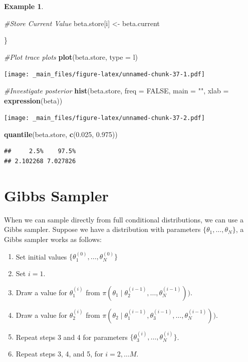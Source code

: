 \documentclass[
]{book}
\newenvironment{Shaded}{\begin{snugshade}}{\end{snugshade}}
\newcommand{\AttributeTok}[1]{\textcolor[rgb]{0.13,0.29,0.53}{#1}}
\newcommand{\CommentTok}[1]{\textcolor[rgb]{0.56,0.35,0.01}{\textit{#1}}}
\newcommand{\ConstantTok}[1]{\textcolor[rgb]{0.56,0.35,0.01}{#1}}
\newcommand{\FloatTok}[1]{\textcolor[rgb]{0.00,0.00,0.81}{#1}}
\newcommand{\FunctionTok}[1]{\textcolor[rgb]{0.13,0.29,0.53}{\textbf{#1}}}
\newcommand{\NormalTok}[1]{#1}
\newcommand{\OtherTok}[1]{\textcolor[rgb]{0.56,0.35,0.01}{#1}}
\newcommand{\StringTok}[1]{\textcolor[rgb]{0.31,0.60,0.02}{#1}}
\theoremstyle{definition}
\theoremstyle{definition}
\newtheorem{example}{Example}[chapter]
\theoremstyle{definition}
\theoremstyle{definition}
\theoremstyle{remark}
\begin{document}
\begin{example}
\begin{Shaded}
\begin{Highlighting}[]
  \CommentTok{\#Store Current Value}
\NormalTok{  beta.store[i] }\OtherTok{\textless{}{-}}\NormalTok{ beta.current}


\NormalTok{\}}

\CommentTok{\#Plot trace plots}
\FunctionTok{plot}\NormalTok{(beta.store, }\AttributeTok{type =} \StringTok{\textquotesingle{}l\textquotesingle{}}\NormalTok{)}
\end{Highlighting}
\end{Shaded}

\texttt{[image: \_main\_files/figure-latex/unnamed-chunk-37-1.pdf]}

\begin{Shaded}
\begin{Highlighting}[]
\CommentTok{\#Investigate posterior}
\FunctionTok{hist}\NormalTok{(beta.store, }\AttributeTok{freq =} \ConstantTok{FALSE}\NormalTok{, }\AttributeTok{main =} \StringTok{""}\NormalTok{, }\AttributeTok{xlab =} \FunctionTok{expression}\NormalTok{(beta))}
\end{Highlighting}
\end{Shaded}

\texttt{[image: \_main\_files/figure-latex/unnamed-chunk-37-2.pdf]}

\begin{Shaded}
\begin{Highlighting}[]
\FunctionTok{quantile}\NormalTok{(beta.store, }\FunctionTok{c}\NormalTok{(}\FloatTok{0.025}\NormalTok{, }\FloatTok{0.975}\NormalTok{))}
\end{Highlighting}
\end{Shaded}

\begin{verbatim}
##     2.5%    97.5% 
## 2.102268 7.027826
\end{verbatim}

\hypertarget{gibbs-sampler}{%
\section{Gibbs Sampler}\label{gibbs-sampler}}

When we can sample directly from full conditional distributions, we can use a Gibbs sampler. Suppose we have a distribution with parameters \(\{\theta_1, \ldots, \theta_N\}\), a Gibbs sampler works as follows:

\begin{enumerate}
\def\labelenumi{\arabic{enumi}.}
\item
  Set initial values \(\{\theta_1^{(0)}, \ldots, \theta_N^{(0)}\}\)
\item
  Set \(i = 1\).
\item
  Draw a value for \(\theta_1^{(i)}\) from \(\pi(\theta_1 \mid \theta_2^{(i-1)}, \ldots, \theta_N^{(i-1)}))\).
\item
  Draw a value for \(\theta_2^{(i)}\) from \(\pi(\theta_2 \mid \theta_1^{(i-1)}, \theta_3^{(i-1)}, \ldots, \theta_N^{(i-1)}))\).
\item
  Repeat steps 3 and 4 for parameters \(\{\theta_3^{(i)}, \ldots, \theta_N^{(i)}\}\).
\item
  Repeat steps 3, 4, and 5, for \(i = 2, \ldots M\).
\end{enumerate}


\end{example}
\end{document}
